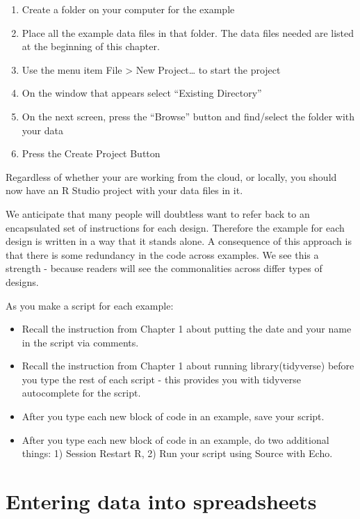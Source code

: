\documentclass[
]{krantz}
\begin{document}
\begin{enumerate}
\def\labelenumi{\arabic{enumi}.}
\item
  Create a folder on your computer for the example
\item
  Place all the example data files in that folder. The data files needed are listed at the beginning of this chapter.
\item
  Use the menu item File \textgreater{} New Project\ldots{} to start the project
\item
  On the window that appears select ``Existing Directory''
\item
  On the next screen, press the ``Browse'' button and find/select the folder with your data
\item
  Press the Create Project Button
\end{enumerate}

Regardless of whether your are working from the cloud, or locally, you should now have an R Studio project with your data files in it.

We anticipate that many people will doubtless want to refer back to an encapsulated set of instructions for each design. Therefore the example for each design is written in a way that it stands alone. A consequence of this approach is that there is some redundancy in the code across examples. We see this a strength - because readers will see the commonalities across differ types of designs.

As you make a script for each example:

\begin{itemize}
\item
  Recall the instruction from Chapter 1 about putting the date and your name in the script via comments.
\item
  Recall the instruction from Chapter 1 about running library(tidyverse) before you type the rest of each script - this provides you with tidyverse autocomplete for the script.
\item
  After you type each new block of code in an example, save your script.
\item
  After you type each new block of code in an example, do two additional things: 1) Session Restart R, 2) Run your script using Source with Echo.
\end{itemize}

\hypertarget{entering-data-into-spreadsheets}{%
\section{Entering data into spreadsheets}\label{entering-data-into-spreadsheets}}
\end{document}
